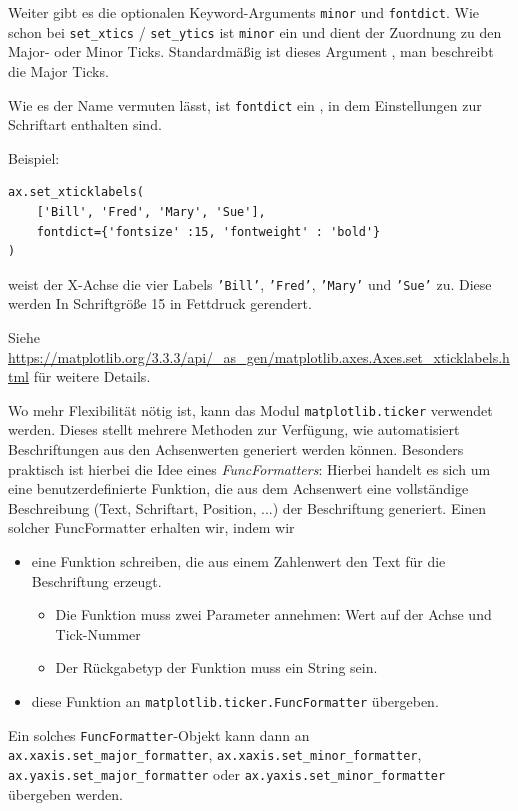 Weiter gibt es die optionalen Keyword-Arguments \texttt{minor} und \texttt{fontdict}. Wie schon bei \texttt{set\_xtics} / \texttt{set\_ytics} ist \texttt{minor} ein  und dient der Zuordnung zu den Major- oder Minor Ticks. Standardmäßig ist dieses Argument , \ie man beschreibt die Major Ticks.

Wie es der Name vermuten lässt, ist \texttt{fontdict} ein , in dem Einstellungen zur Schriftart enthalten sind.

Beispiel:
\begin{verbatim}
ax.set_xticklabels(
    ['Bill', 'Fred', 'Mary', 'Sue'],
    fontdict={'fontsize' :15, 'fontweight' : 'bold'}
)
\end{verbatim}
weist der X-Achse die vier Labels \texttt{'Bill'}, \texttt{'Fred'}, \texttt{'Mary'} und \texttt{'Sue'} zu. Diese werden In Schriftgröße 15 in Fettdruck gerendert.

Siehe \url{https://matplotlib.org/3.3.3/api/_as_gen/matplotlib.axes.Axes.set_xticklabels.html} für weitere Details.

Wo mehr Flexibilität nötig ist, kann das Modul \texttt{matplotlib.ticker} verwendet werden. Dieses stellt mehrere Methoden zur Verfügung, wie automatisiert Beschriftungen aus den Achsenwerten generiert werden können. Besonders praktisch ist hierbei die Idee eines \emph{FuncFormatters}: Hierbei handelt es sich um eine benutzerdefinierte Funktion, die aus dem Achsenwert eine vollständige Beschreibung (Text, Schriftart, Position, ...) der Beschriftung generiert. Einen solcher FuncFormatter erhalten wir, indem wir
\begin{itemize}
\item eine Funktion schreiben, die aus einem Zahlenwert den Text für die Beschriftung erzeugt.
	\begin{itemize}
	\item Die Funktion muss zwei Parameter annehmen: Wert auf der Achse und Tick-Nummer
	\item Der Rückgabetyp der Funktion muss ein String sein.
	\end{itemize}
\item diese Funktion an \texttt{matplotlib.ticker.FuncFormatter} übergeben.
\end{itemize}
Ein solches \texttt{FuncFormatter}-Objekt kann dann an \texttt{ax.xaxis.set\_major\_formatter}, \texttt{ax.xaxis.set\_minor\_formatter}, \texttt{ax.yaxis.set\_major\_formatter} oder  \texttt{ax.yaxis.set\_minor\_formatter} übergeben werden.



